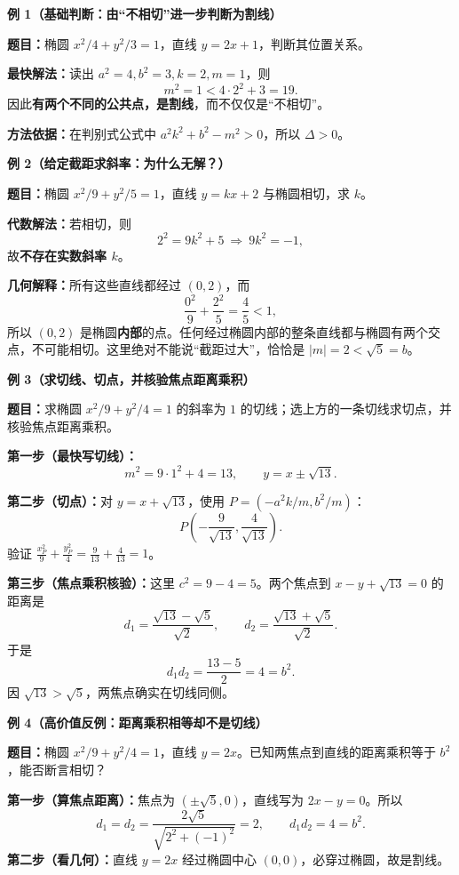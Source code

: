 \begin{examplebox}
\textbf{\textcolor{CExample}{例 1（基础判断：由“不相切”进一步判断为割线）}}

\textbf{题目：}椭圆 $x^2/4+y^2/3=1$，直线 $y=2x+1$，判断其位置关系。

\textbf{最快解法：}读出 $a^2=4,b^2=3,k=2,m=1$，则
\[
 m^2=1<4\cdot2^2+3=19.
\]
因此\textbf{有两个不同的公共点，是割线}，而不仅仅是“不相切”。

\textbf{方法依据：}在判别式公式中 $a^2k^2+b^2-m^2>0$，所以 $\Delta>0$。

\medskip
\textbf{\textcolor{CExample}{例 2（给定截距求斜率：为什么无解？）}}

\textbf{题目：}椭圆 $x^2/9+y^2/5=1$，直线 $y=kx+2$ 与椭圆相切，求 $k$。

\textbf{代数解法：}若相切，则
\[
 2^2=9k^2+5\ \Longrightarrow\ 9k^2=-1,
\]
故\textbf{不存在实数斜率 $k$}。

\textbf{几何解释：}所有这些直线都经过 $(0,2)$，而
\[
 \frac{0^2}{9}+\frac{2^2}{5}=\frac45<1,
\]
所以 $(0,2)$ 是椭圆\textbf{内部}的点。任何经过椭圆内部的整条直线都与椭圆有两个交点，不可能相切。这里绝对不能说“截距过大”，恰恰是 $|m|=2<\sqrt5=b$。

\medskip
\textbf{\textcolor{CExample}{例 3（求切线、切点，并核验焦点距离乘积）}}

\textbf{题目：}求椭圆 $x^2/9+y^2/4=1$ 的斜率为 $1$ 的切线；选上方的一条切线求切点，并核验焦点距离乘积。

\textbf{第一步（最快写切线）：}
\[
 m^2=9\cdot1^2+4=13,
 \qquad\boxed{y=x\pm\sqrt{13}}.
\]

\textbf{第二步（切点）：}对 $y=x+\sqrt{13}$，使用 $P=(-a^2k/m,b^2/m)$：
\[
 \boxed{P\left(-\frac9{\sqrt{13}},\frac4{\sqrt{13}}\right)}.
\]
验证 $\frac{x_P^2}{9}+\frac{y_P^2}{4}=\frac9{13}+\frac4{13}=1$。

\textbf{第三步（焦点乘积核验）：}这里 $c^2=9-4=5$。两个焦点到 $x-y+\sqrt{13}=0$ 的距离是
\[
 d_1=\frac{\sqrt{13}-\sqrt5}{\sqrt2},\qquad
 d_2=\frac{\sqrt{13}+\sqrt5}{\sqrt2}.
\]
于是
\[
 \boxed{d_1d_2=\frac{13-5}{2}=4=b^2}.
\]
因 $\sqrt{13}>\sqrt5$，两焦点确实在切线同侧。

\medskip
\textbf{\textcolor{CExample}{例 4（高价值反例：距离乘积相等却不是切线）}}

\textbf{题目：}椭圆 $x^2/9+y^2/4=1$，直线 $y=2x$。已知两焦点到直线的距离乘积等于 $b^2$，能否断言相切？

\textbf{第一步（算焦点距离）：}焦点为 $(\pm\sqrt5,0)$，直线写为 $2x-y=0$。所以
\[
 d_1=d_2=\frac{2\sqrt5}{\sqrt{2^2+(-1)^2}}=2,
 \qquad d_1d_2=4=b^2.
\]
\textbf{第二步（看几何）：}直线 $y=2x$ 经过椭圆中心 $(0,0)$，必穿过椭圆，故是割线。


\end{examplebox}
